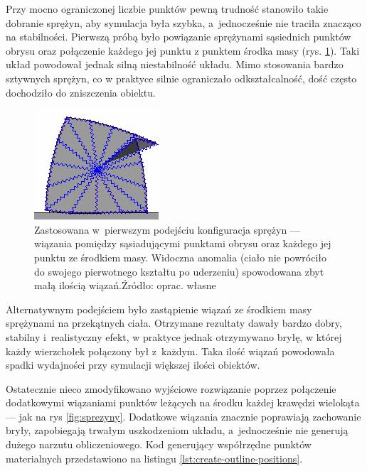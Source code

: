 Przy mocno ograniczonej liczbie punktów pewną trudność stanowiło takie dobranie sprężyn, aby symulacja była szybka, a~jednocześnie nie traciła znacząco na stabilności. Pierwszą próbą było powiązanie sprężynami sąsiednich punktów obrysu oraz połączenie każdego jej punktu z punktem środka masy (rys. \ref{fig:pointmass-first}). Taki układ powodował jednak silną niestabilność układu. Mimo stosowania bardzo sztywnych sprężyn, co w praktyce silnie ograniczało odkształcalność, dość często dochodziło do zniszczenia obiektu.

\begin{figure}[h]
	\centering
	\includegraphics[width=0.3\linewidth]{images/pointmass-first}
	\caption[Zastosowana w~pierwszym podejściu konfiguracja sprężyn --- wiązania pomiędzy sąsiadującymi punktami obrysu oraz każdego jej punktu ze środkiem masy]{Zastosowana w~pierwszym podejściu konfiguracja sprężyn --- wiązania pomiędzy sąsiadującymi punktami obrysu oraz każdego jej punktu ze środkiem masy. Widoczna anomalia (ciało nie powróciło do swojego pierwotnego kształtu po uderzeniu) spowodowana zbyt małą ilością wiązań.\newline Źródło: oprac. własne}
	\label{fig:pointmass-first}
\end{figure}

Alternatywnym podejściem było zastąpienie wiązań ze środkiem masy sprężynami na przekątnych ciała. Otrzymane rezultaty dawały bardzo dobry, stabilny i~realistyczny efekt, w praktyce jednak otrzymywano bryłę, w której każdy wierzchołek połączony był z~każdym. Taka ilość wiązań powodowała spadki wydajności przy symulacji większej ilości obiektów.

Ostatecznie nieco zmodyfikowano wyjściowe rozwiązanie poprzez połączenie dodatkowymi wiązaniami punktów leżących na środku każdej krawędzi wielokąta --- jak na rys \ref{fig:sprezyny}. Dodatkowe wiązania znacznie poprawiają zachowanie bryły, zapobiegają trwałym uszkodzeniom układu, a~jednocześnie nie generują dużego narzutu obliczeniowego. Kod generujący współrzędne punktów materialnych przedstawiono na listingu \ref{lst:create-outline-positions}.

